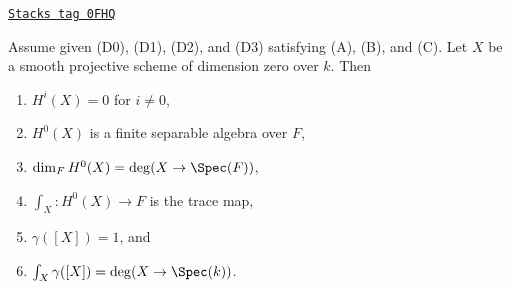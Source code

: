 \begin{lemma}[Dim 0]
\label{weil-lemma-dim-0}
\href{https://stacks.math.columbia.edu/tag/0FHQ}{\texttt{Stacks tag 0FHQ}}

Assume given (D0), (D1), (D2), and (D3) satisfying (A), (B), and (C).
Let $X$ be a smooth projective scheme of dimension zero over $k$.
Then
\begin{enumerate}
\item $H^i(X) = 0$ for $i \not = 0$,
\item $H^0(X)$ is a finite separable algebra over $F$,
\item $\dim_F H^0(X) = \deg(X \to \Spec(F))$,
\item $\int_X : H^0(X) \to F$ is the trace map,
\item $\gamma([X]) = 1$, and
\item $\int_X \gamma([X]) = \deg(X \to \Spec(k))$.
\end{enumerate}
\end{lemma}

